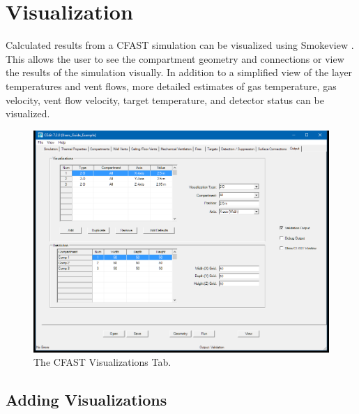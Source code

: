 \chapter{Visualization}

Calculated results from a CFAST simulation can be visualized using Smokeview \cite{Smokeview_Users_Guide_6}. This allows the user to see the compartment geometry and connections or view the results of the simulation visually. In addition to a simplified view of the layer temperatures and vent flows, more detailed estimates of gas temperature, gas velocity, vent flow velocity, target temperature, and detector status can be visualized.

\begin{figure}[h!]
\begin{center}
\includegraphics[width=6.5in]{FIGURES/Visualizations_Tab}
\caption[The CFAST Visualizations Tab]{The CFAST Visualizations Tab.}
\end{center}
\end{figure}

\section{Adding Visualizations}
\label{info:ISOF}
\label{info:SLCF}

